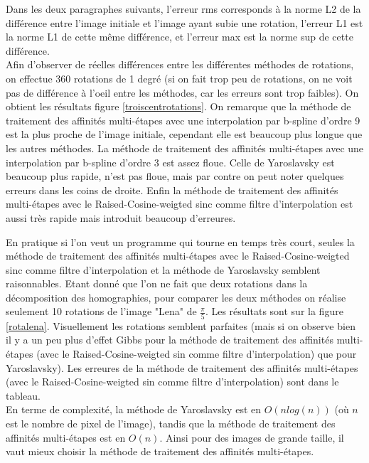 	Dans les deux paragraphes suivants, l'erreur rms corresponds à la norme L2 de la différence entre l'image initiale et l'image ayant subie une rotation, l'erreur L1 est la norme L1 de cette même différence, et l'erreur max est la norme sup de cette différence.\\

	Afin d'observer de réelles différences entre les différentes méthodes de rotations, on effectue 360 rotations de 1 degré (si on fait trop peu de rotations, on ne voit pas de différence à l'oeil entre les méthodes, car les erreurs sont trop faibles). On obtient les résultats figure  \ref{troiscentrotations}.  On remarque que la méthode de traitement des affinités multi-étapes avec une interpolation par b-spline d'ordre 9 est la plus proche de l'image initiale, cependant elle est beaucoup plus longue que les autres méthodes.  La méthode de traitement des affinités multi-étapes avec une interpolation par b-spline d'ordre 3 est assez floue. Celle de Yaroslavsky est beaucoup plus rapide, n'est pas floue, mais par contre on peut noter quelques erreurs dans les coins de droite. Enfin  la méthode de traitement des affinités multi-étapes avec le  Raised-Cosine-weigted sinc comme filtre d'interpolation est aussi très rapide mais introduit beaucoup d'erreures.\\
\label{pleinsderotations}

	En pratique si l'on veut un programme qui tourne en temps très court, seules  la méthode de traitement des affinités multi-étapes avec le Raised-Cosine-weigted sinc comme filtre d'interpolation et la méthode de Yaroslavsky semblent raisonnables. Etant donné que l'on ne fait que deux rotations dans la décomposition des homographies, pour comparer les deux méthodes on réalise seulement 10 rotations de l'image "Lena" de $\frac{\pi}{5}$. Les résultats sont sur la figure \ref{rotalena}. Visuellement les rotations semblent parfaites (mais si on observe bien il y a un peu plus d'effet Gibbs pour la méthode de traitement des affinités multi-étapes (avec le Raised-Cosine-weigted sin comme filtre d'interpolation) que pour Yaroslavsky). Les erreures de la méthode de traitement des affinités multi-étapes (avec le Raised-Cosine-weigted sin comme filtre d'interpolation) sont dans le tableau. \\

En terme de complexité, la méthode de Yaroslavsky est en $O(n log(n))$ (où $n$ est le nombre de pixel de l'image), tandis que la méthode de traitement des affinités multi-étapes est en $O(n)$. Ainsi pour des images de grande taille, il vaut mieux choisir la méthode de traitement des affinités multi-étapes.\\

